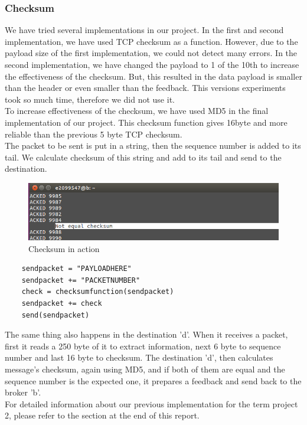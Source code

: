 \documentclass[12pt,journal,compsoc]{IEEEtran}
\begin{document}
\subsubsection{Checksum}
We have tried several implementations in our project. In the first and second implementation, we have used TCP checksum as a function. However, due to the payload size of the first implementation, we could not detect many errors. In the second implementation, we have changed the payload to 1 of the 10th to increase the effectiveness of the checksum. But, this resulted in the data payload is smaller than the header or even smaller than the feedback. This versions experiments took so much time, therefore we did not use it.\\
To increase effectiveness of the checksum, we have used MD5 in the final implementation of our project. This checksum function gives 16byte and more reliable than the previous 5 byte TCP checksum.\\
The packet to be sent is put in a string, then the sequence number is added to its tail. We calculate checksum of this string and add to its tail and send to the destination.
\begin{figure}[h!]
\centering
\captionsetup{justification=centering}
\includegraphics[width = \linewidth]{checksum.png}
\caption{Checksum in action}
\label{fig:checksum}
\end{figure}
\begin{verbatim}
	sendpacket = "PAYLOADHERE"
	sendpacket += "PACKETNUMBER"
	check = checksumfunction(sendpacket)
	sendpacket += check
	send(sendpacket)
\end{verbatim}
The same thing also happens in the destination 'd'. When it receives a packet, first it reads a 250 byte of it to extract information, next 6 byte to sequence number and last 16 byte to checksum. The destination 'd', then calculates message's checksum, again using MD5, and if both of them are equal and the sequence number is the expected one, it prepares a feedback and send back to the broker 'b'. \\
For detailed information about our previous implementation for the term project 2, please refer to the section at the end of this report.\\
\end{document}
